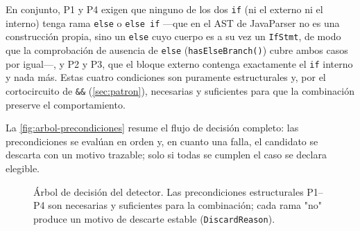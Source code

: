 En conjunto, P1 y P4 exigen que ninguno de los dos \lstinline|if| (ni el
externo ni el interno) tenga rama \lstinline|else| o \lstinline|else if| ---que
en el AST de JavaParser no es una construcción propia, sino un \lstinline|else|
cuyo cuerpo es a su vez un \lstinline|IfStmt|, de modo que la comprobación de
ausencia de \lstinline|else| (\lstinline|hasElseBranch()|) cubre ambos casos por
igual---, y P2 y P3, que el bloque externo contenga exactamente el
\lstinline|if| interno y nada más. Estas cuatro condiciones son puramente estructurales y, por el
cortocircuito de \lstinline|&&| (\autoref{sec:patron}), necesarias y
suficientes para que la combinación preserve el comportamiento.

La \autoref{fig:arbol-precondiciones} resume el flujo de decisión completo: las
precondiciones se evalúan en orden y, en cuanto una falla, el candidato se
descarta con un motivo trazable; solo si todas se cumplen el caso se declara
elegible.

\begin{figure}[ht]
\centering
{}
\caption{Árbol de decisión del detector. Las precondiciones estructurales
P1--P4 son necesarias y suficientes para la combinación; cada rama "no" produce
un motivo de descarte estable (\texttt{DiscardReason}).}
\label{fig:arbol-precondiciones}
\end{figure}

